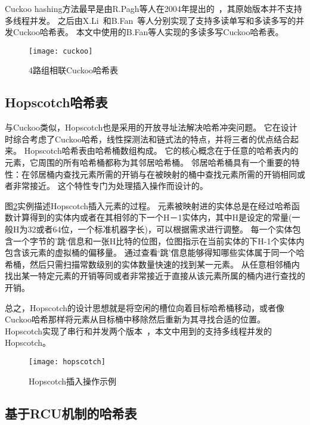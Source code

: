 Cuckoo hashing方法最早是由R.Pagh等人在2004年提出的~\cite{cuckoo-src}，其原始版本并不支持多线程并发。
之后由X.Li~\cite{memc3}和B.Fan~\cite{cuckoo}等人分别实现了支持多读单写和多读多写的并发Cuckoo哈希表。
本文中使用的B.Fan等人实现的多读多写Cuckoo哈希表。

\begin{figure}[htbp]
\centering
\texttt{[image: cuckoo]}
\caption{4路组相联Cuckoo哈希表}\label{fig:cuckoo}
\end{figure}

\subsection{Hopscotch哈希表}
与Cuckoo类似，Hopscotch也是采用的开放寻址法解决哈希冲突问题。
它在设计时综合考虑了Cuckoo哈希，线性探测法和链式法的特点，并将三者的优点结合起来。
Hopscotch哈希表由哈希桶数组构成。
它的核心概念在于任意的哈希表内的元素，它周围的所有哈希桶都称为其邻居哈希桶。
邻居哈希桶具有一个重要的特性：在邻居桶内查找元素所需的开销与在被映射的桶中查找元素所需的开销相同或者非常接近。
这个特性专门为处理插入操作而设计的。

图\ref{fig:hopscotch}实例描述Hopscotch插入元素的过程。
元素被映射进的实体总是在经过哈希函数计算得到的实体内或者在其相邻的下一个H－1实体内，其中H是设定的常量(一般H为32或者64位，一个标准机器字长)，可以根据需求进行调整。
每一个实体包含一个字节的’跳‘信息和一张H比特的位图，位图指示在当前实体的下H-1个实体内包含该元素的虚拟桶的偏移量。
通过查看‘跳’信息能够得知哪些实体属于同一个哈希桶，然后只需扫描常数级别的实体数量快速的找到某一元素。
从任意相邻桶内找出某一特定元素的开销等同或者非常接近于直接从该元素所属的桶内进行查找的开销。


总之，Hopscotch的设计思想就是将空闲的槽位向着目标哈希桶移动，或者像Cuckoo哈希那样将元素从目标桶中移除然后重新为其寻找合适的位置。
Hopscotch实现了串行和并发两个版本~\cite{hopscotch}，本文中用到的支持多线程并发的Hopscotch。

\begin{figure}[htbp]
\centering
\texttt{[image: hopscotch]}
\caption{Hopscotch插入操作示例}
\label{fig:hopscotch}
\end{figure}

\subsection{基于RCU机制的哈希表}


